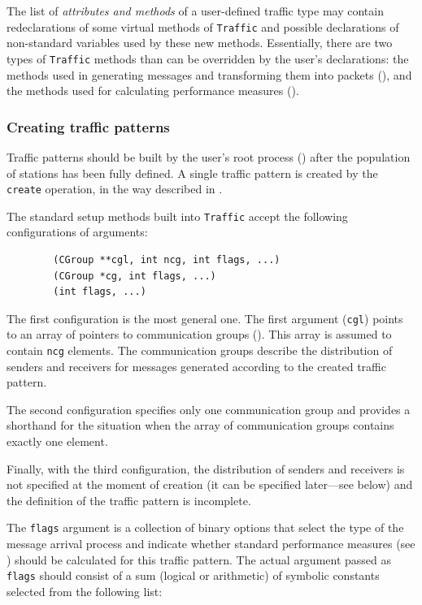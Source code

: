 The list of {\em attributes and methods\/} of a user-defined traffic type
may contain redeclarations of
some virtual methods of {\tt Traffic} and possible declarations
of non-standard variables used by these new methods.
Essentially, there are two types of {\tt Traffic} methods than can be
overridden by the user's declarations: the methods used in generating messages
and transforming them into packets (),
and the methods used for calculating performance measures ().

\subsubsection{Creating traffic patterns}
\label{rm_cl_dt_ct}

Traffic patterns should be built by the user's root process ()
after the population of stations has been fully defined.
A single traffic pattern is created by the {\tt create} operation, in the
way described in .

The standard setup methods built into {\tt Traffic} accept the following
configurations of arguments:

\begin{verbatim}
        (CGroup **cgl, int ncg, int flags, ...)
        (CGroup *cg, int flags, ...)
        (int flags, ...)
\end{verbatim}

The first configuration is the most general one.
The first argument ({\tt cgl}) points to an array of pointers to communication
groups ().
This array is assumed to contain {\tt ncg} elements.
The communication groups describe the distribution of senders and receivers
for messages generated according to the created traffic pattern.

The second configuration specifies only one communication group and provides
a shorthand for the situation when the array of communication groups
contains exactly one element.

Finally, with the third configuration, the distribution of senders and
receivers is not specified at the moment of creation (it can be specified
later---see below) and the definition of the traffic pattern is incomplete.

The {\tt flags} argument is a collection of binary options that select the type
of the message arrival process and indicate whether standard performance
measures (see ) should be calculated for this traffic pattern.
The actual argument passed as {\tt flags} should consist of a sum (logical
or arithmetic) of symbolic constants selected from the following list:

